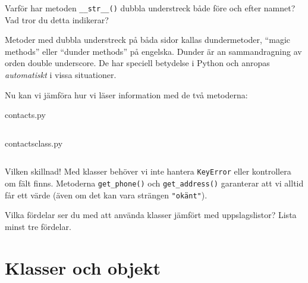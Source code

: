 \begin{exercise}
  Varför har metoden \texttt{__str__()} dubbla understreck 
  både före och efter namnet? Vad tror du detta indikerar?
\end{exercise}

Metoder med dubbla understreck på båda sidor kallas dundermetoder,
\enquote{\foreignlanguage{english}{magic methods}} eller 
\enquote{\foreignlanguage{english}{dunder methods}} på engelska.
Dunder är an sammandragning av orden \foreignlanguage{english}{double 
underscore}.
De har speciell betydelse i Python och anropas \emph{automatiskt} i vissa 
situationer.

Nu kan vi jämföra hur vi läser information med de två metoderna:

\begin{frame}[fragile]
  contacts.py \hrulefill
  \inputminted[linenos,firstline=25,lastline=35]{python}{examples/contacts.py}
  \vspace{0.5em}
  contacts\textunderscore{}class.py \hrulefill
  \inputminted[linenos,firstline=23,lastline=25]{python}{examples/contacts_class.py}
\end{frame}

Vilken skillnad! Med klasser behöver vi inte hantera \texttt{KeyError} 
eller kontrollera om fält finns. Metoderna \texttt{get_phone()} och 
\texttt{get_address()} garanterar att vi alltid får ett värde 
(även om det kan vara strängen \texttt{"okänt"}).

\begin{exercise}
  Vilka fördelar ser du med att använda klasser jämfört med uppslagslistor? 
  Lista minst tre fördelar.
\end{exercise}


\section{Klasser och objekt}


